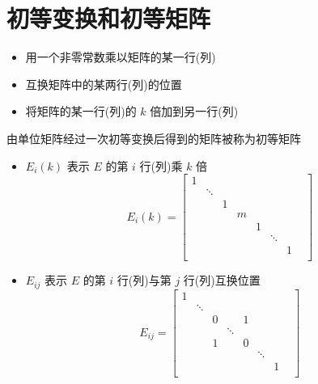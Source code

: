 \section{初等变换和初等矩阵}

\begin{definition}[初等变换]
	\begin{itemize}
		\item 用一个非零常数乘以矩阵的某一行(列)
		\item 互换矩阵中的某两行(列)的位置
		\item 将矩阵的某一行(列)的 $k$ 倍加到另一行(列)
	\end{itemize}
\end{definition}
\begin{definition}[初等矩阵]
	由单位矩阵经过一次初等变换后得到的矩阵被称为初等矩阵
	\begin{itemize}
		\item $E_{i}(k)$ 表示 $E$ 的第 $i$ 行(列)乘 $k$ 倍
		$$E_{i}(k) = \begin{bmatrix}
			1 &        &   &   &   &        &   &\\
			  & \ddots &   &   &   &        &   &\\
			  &        & 1 &   &   &        &   &\\
			  &        &   & m &   &        &   &\\
			  &        &   &   & 1 &        &   &\\
			  &        &   &   &   & \ddots &   &\\
			  &        &   &   &   &        & 1 &\\
		\end{bmatrix}$$

		\item $E_{ij}$ 表示 $E$ 的第 $i$ 行(列)与第 $j$ 行(列)互换位置
		$$E_{ij} = \begin{bmatrix}
			1 &        &   &        &   &        &   &\\
			  & \ddots &   &        &   &        &   &\\
			  &        & 0 &        & 1 &        &   &\\
			  &        &   & \ddots &   &        &   &\\
			  &        & 1 &        & 0 &        &   &\\
			  &        &   &        &   & \ddots &   &\\
			  &        &   &        &   &        & 1 &\\
		\end{bmatrix}$$


\end{itemize}
\end{definition}
